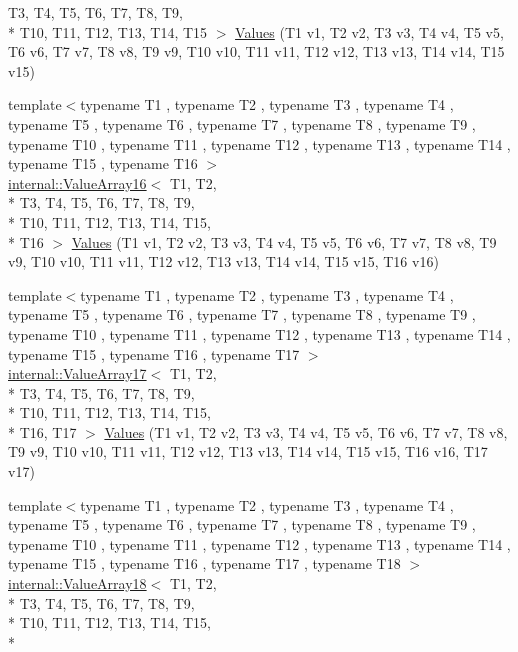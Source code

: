 \begin{DoxyCompactItemize}
T3, T4, T5, T6, T7, T8, T9, \\*
T10, T11, T12, T13, T14, T15 $>$ \hyperlink{namespacetesting_ab0c1943e4f680df0d92c695ed0ac36df}{Values} (T1 v1, T2 v2, T3 v3, T4 v4, T5 v5, T6 v6, T7 v7, T8 v8, T9 v9, T10 v10, T11 v11, T12 v12, T13 v13, T14 v14, T15 v15)
\item 
{\footnotesize template$<$typename T1 , typename T2 , typename T3 , typename T4 , typename T5 , typename T6 , typename T7 , typename T8 , typename T9 , typename T10 , typename T11 , typename T12 , typename T13 , typename T14 , typename T15 , typename T16 $>$ }\\\hyperlink{classtesting_1_1internal_1_1_value_array16}{internal\-::\-Value\-Array16}$<$ T1, T2, \\*
T3, T4, T5, T6, T7, T8, T9, \\*
T10, T11, T12, T13, T14, T15, \\*
T16 $>$ \hyperlink{namespacetesting_afebcdc503d4a99cae5924523dcfd02e1}{Values} (T1 v1, T2 v2, T3 v3, T4 v4, T5 v5, T6 v6, T7 v7, T8 v8, T9 v9, T10 v10, T11 v11, T12 v12, T13 v13, T14 v14, T15 v15, T16 v16)
\item 
{\footnotesize template$<$typename T1 , typename T2 , typename T3 , typename T4 , typename T5 , typename T6 , typename T7 , typename T8 , typename T9 , typename T10 , typename T11 , typename T12 , typename T13 , typename T14 , typename T15 , typename T16 , typename T17 $>$ }\\\hyperlink{classtesting_1_1internal_1_1_value_array17}{internal\-::\-Value\-Array17}$<$ T1, T2, \\*
T3, T4, T5, T6, T7, T8, T9, \\*
T10, T11, T12, T13, T14, T15, \\*
T16, T17 $>$ \hyperlink{namespacetesting_a5cb89ee5c491cbe65de523f9f1bc1987}{Values} (T1 v1, T2 v2, T3 v3, T4 v4, T5 v5, T6 v6, T7 v7, T8 v8, T9 v9, T10 v10, T11 v11, T12 v12, T13 v13, T14 v14, T15 v15, T16 v16, T17 v17)
\item 
{\footnotesize template$<$typename T1 , typename T2 , typename T3 , typename T4 , typename T5 , typename T6 , typename T7 , typename T8 , typename T9 , typename T10 , typename T11 , typename T12 , typename T13 , typename T14 , typename T15 , typename T16 , typename T17 , typename T18 $>$ }\\\hyperlink{classtesting_1_1internal_1_1_value_array18}{internal\-::\-Value\-Array18}$<$ T1, T2, \\*
T3, T4, T5, T6, T7, T8, T9, \\*
T10, T11, T12, T13, T14, T15, \\*

\end{DoxyCompactItemize}
